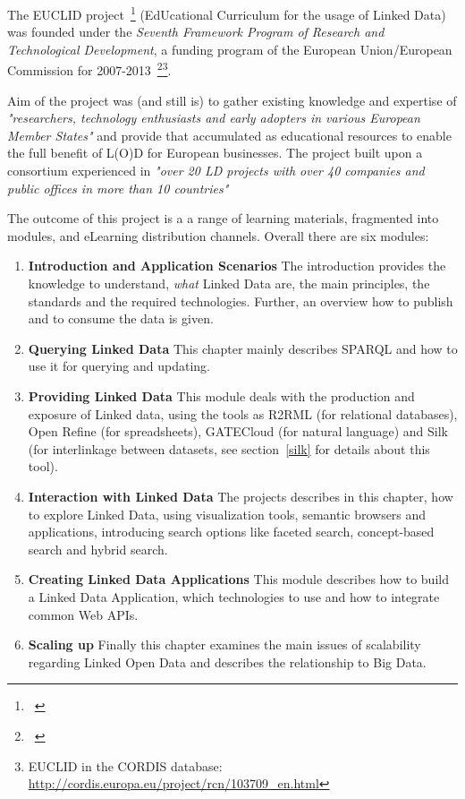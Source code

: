 The EUCLID project~\footnote{~\cite{euclid:home}} (EdUcational Curriculum for the usage of Linked Data) was founded under the \emph{Seventh Framework Program of Research and Technological Development}, a funding program of the European Union/European Commission for 2007-2013~\footnote{~\cite{eu:fp7}}\footnote{ EUCLID in the CORDIS database: \url{http://cordis.europa.eu/project/rcn/103709_en.html}}.

Aim of the project was (and still is) to gather existing knowledge and expertise of \emph{"researchers, technology enthusiasts and early adopters in various European Member States"} and provide that accumulated as educational resources to enable the  full benefit of L(O)D for European businesses. The project built upon a consortium experienced in \emph{"over 20 LD projects with over 40 companies and public offices in more than 10 countries"}~\cite{euclid:about}

The outcome of this project is a a range of learning materials, fragmented into modules, and eLearning distribution channels. Overall there are six modules:

\begin{enumerate}

	\item \textbf{Introduction and Application Scenarios}
	The introduction provides the knowledge to understand, \emph{what} Linked Data are, the main principles, the standards and the required technologies. Further, an overview how to publish and to consume the data is given.
	
	\item \textbf{Querying Linked Data}
	This chapter mainly describes SPARQL and how to use it for querying and updating.
	
	\item \textbf{Providing Linked Data}
	This module deals with the production and exposure of Linked data, using the tools as R2RML (for relational databases), Open Refine (for spreadsheets), GATECloud (for natural language) and Silk (for interlinkage between datasets, see section~\ref{silk} for details about this tool).
	
	\item \textbf{Interaction with Linked Data}
	The projects describes in this chapter, how to explore Linked Data, using visualization tools, semantic browsers and applications, introducing search options like faceted search, concept-based search and hybrid search.
	
	\item \textbf{Creating Linked Data Applications}
	This module describes how to build a Linked Data Application, which technologies to use and how to integrate common Web APIs.
	
	\item \textbf{Scaling up}
	Finally this chapter examines the main issues of scalability regarding Linked Open Data and describes the relationship to Big Data.
	
\end{enumerate}

